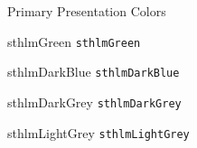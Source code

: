 \documentclass[compress]{beamer}
\begin{document}
\begin{frame}{Primary Presentation Colors}
\begin{multicols}{2}
\begin{beamercolorbox}[wd=\linewidth,ht=2ex,dp=0.7ex]{sthlmGreen}
	\texttt{sthlmGreen}
\end{beamercolorbox}

\begin{beamercolorbox}[wd=\linewidth,ht=2ex,dp=0.7ex]{sthlmDarkBlue}
	\texttt{sthlmDarkBlue}
\end{beamercolorbox}

\begin{beamercolorbox}[wd=\linewidth,ht=2ex,dp=0.7ex]{sthlmDarkGrey}
	\texttt{sthlmDarkGrey}
\end{beamercolorbox}

\begin{beamercolorbox}[wd=\linewidth,ht=2ex,dp=0.7ex]{sthlmLightGrey}
	\texttt{sthlmLightGrey}
\end{beamercolorbox}

\end{multicols}
\end{frame}

\end{document}
